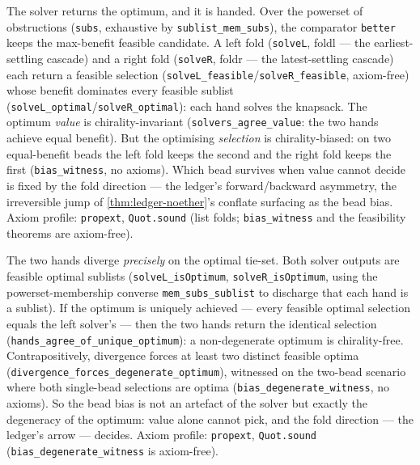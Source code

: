 \begin{theorem}\label{thm:allocation-solver}\leanok{}
The solver returns the optimum, and it is handed. Over the powerset of
obstructions (\texttt{subs}, exhaustive by \texttt{sublist\_mem\_subs}), the
comparator \texttt{better} keeps the max-benefit feasible candidate. A left fold
(\texttt{solveL}, foldl --- the earliest-settling cascade) and a right fold
(\texttt{solveR}, foldr --- the latest-settling cascade) each return a feasible
selection (\texttt{solveL\_feasible}/\texttt{solveR\_feasible}, axiom-free) whose
benefit dominates every feasible sublist
(\texttt{solveL\_optimal}/\texttt{solveR\_optimal}): each hand solves the knapsack.
The optimum \emph{value} is chirality-invariant (\texttt{solvers\_agree\_value}:
the two hands achieve equal benefit). But the optimising \emph{selection} is
chirality-biased: on two equal-benefit beads the left fold keeps the second and the
right fold keeps the first (\texttt{bias\_witness}, no axioms). Which bead survives
when value cannot decide is fixed by the fold direction --- the ledger's
forward/backward asymmetry, the irreversible jump of \cref{thm:ledger-noether}'s
conflate surfacing as the bead bias. Axiom profile: \texttt{propext},
\texttt{Quot.sound} (list folds; \texttt{bias\_witness} and the feasibility
theorems are axiom-free).
\end{theorem}

\begin{theorem}\label{thm:bias-is-degeneracy}\leanok{}
The two hands diverge \emph{precisely} on the optimal tie-set. Both solver
outputs are feasible optimal sublists (\texttt{solveL\_isOptimum},
\texttt{solveR\_isOptimum}, using the powerset-membership converse
\texttt{mem\_subs\_sublist} to discharge that each hand is a sublist). If the
optimum is uniquely achieved --- every feasible optimal selection equals the left
solver's --- then the two hands return the identical selection
(\texttt{hands\_agree\_of\_unique\_optimum}): a non-degenerate optimum is
chirality-free. Contrapositively, divergence forces at least two distinct feasible
optima (\texttt{divergence\_forces\_degenerate\_optimum}), witnessed on the
two-bead scenario where both single-bead selections are optima
(\texttt{bias\_degenerate\_witness}, no axioms). So the bead bias is not an
artefact of the solver but exactly the degeneracy of the optimum: value alone
cannot pick, and the fold direction --- the ledger's arrow --- decides. Axiom
profile: \texttt{propext}, \texttt{Quot.sound}
(\texttt{bias\_degenerate\_witness} is axiom-free).
\end{theorem}

